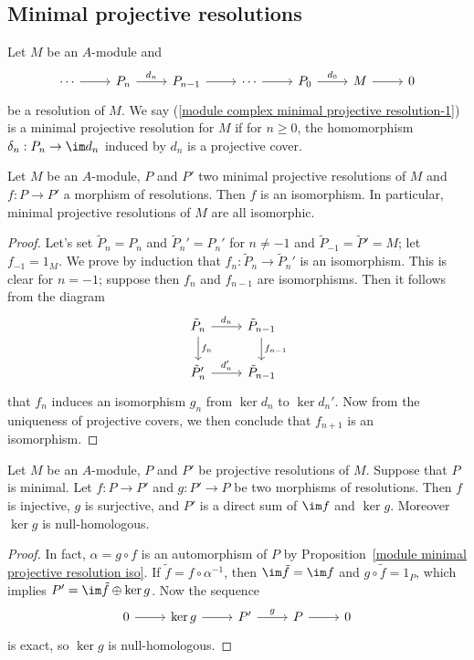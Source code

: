 \subsection{Minimal projective resolutions}
Let $M$ be an $A$-module and 
\begin{equation}\label{module complex minimal projective resolution-1}
\begin{tikzcd}
\cdots\ar[r]&P_n\ar[r,"d_n"]&P_{n-1}\ar[r]&\cdots\ar[r]&P_0\ar[r,"d_0"]&M\ar[r]&0
\end{tikzcd}
\end{equation}
be a resolution of $M$. We say (\ref{module complex minimal projective resolution-1}) is a minimal projective resolution for $M$ if for $n\geq 0$, the homomorphism $\delta_n:P_n\to\im d_n$ induced by $d_n$ is a projective cover.
\begin{proposition}\label{module minimal projective resolution iso}
Let $M$ be an $A$-module, $P$ and $P'$ two minimal projective resolutions of $M$ and $f:P\to P'$ a morphism of resolutions. Then $f$ is an isomorphism. In particular, minimal projective resolutions of $M$ are all isomorphic.
\end{proposition}
\begin{proof}
Let's set $\tilde{P}_n=P_n$ and $\tilde{P}_n'=P_n'$ for $n\neq -1$ and $\tilde{P}_{-1}=\tilde{P}'=M$; let $f_{-1}=1_M$. We prove by induction that $f_n:\tilde{P}_n\to\tilde{P}_n'$ is an isomorphism. This is clear for $n=-1$; suppose then $f_n$ and $f_{n-1}$ are isomorphisms. Then it follows from the diagram
\[\begin{tikzcd}
\tilde{P}_n\ar[r,"d_n"]\ar[d,"f_n"]&\tilde{P}_{n-1}\ar[d,"f_{n-1}"]\\
\tilde{P}_n'\ar[r,"d_n'"]&\tilde{P}_{n-1}
\end{tikzcd}\]
that $f_n$ induces an isomorphism $g_n$ from $\ker d_n$ to $\ker d_n'$. Now from the uniqueness of projective covers, we then conclude that $f_{n+1}$ is an isomorphism.
\end{proof}
\begin{corollary}\label{module minimal projective resolution morphism out and in}
Let $M$ be an $A$-module, $P$ and $P'$ be projective resolutions of $M$. Suppose that $P$ is minimal. Let $f:P\to P'$ and $g:P'\to P$ be two morphisms of resolutions. Then $f$ is injective, $g$ is surjective, and $P'$ is a direct sum of $\im f$ and $\ker g$. Moreover $\ker g$ is null-homologous.
\end{corollary}
\begin{proof}
In fact, $\alpha=g\circ f$ is an automorphism of $P$ by Proposition~\ref{module minimal projective resolution iso}. If $\tilde{f}=f\circ\alpha^{-1}$, then $\im\tilde{f}=\im f$ and $g\circ\tilde{f}=1_P$, which implies $P'=\im\tilde{f}\oplus\ker g$. Now the sequence
\[\begin{tikzcd}
0\ar[r]&\ker g\ar[r]&P'\ar[r,"g"]&P\ar[r]&0
\end{tikzcd}\]
is exact, so $\ker g$ is null-homologous.
\end{proof}
